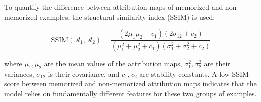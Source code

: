 To quantify the difference between attribution 
maps of memorized and non-memorized examples, 
the structural similarity index (SSIM) is used:

\begin{equation}
\text{SSIM}(\mathcal{A}_1, \mathcal{A}_2) = 
\frac{(2\mu_1\mu_2 + c_1)(2\sigma_{12} + c_2)}
{(\mu_1^2 + \mu_2^2 + c_1)
(\sigma_1^2 + \sigma_2^2 + c_2)}
\label{eq:ssim}
\end{equation}

where $\mu_1, \mu_2$ are the mean values of 
the attribution maps, $\sigma_1^2, \sigma_2^2$ 
are their variances, $\sigma_{12}$ is their 
covariance, and $c_1, c_2$ are stability 
constants. A low SSIM score between memorized 
and non-memorized attribution maps indicates 
that the model relies on fundamentally different 
features for these two groups of examples.